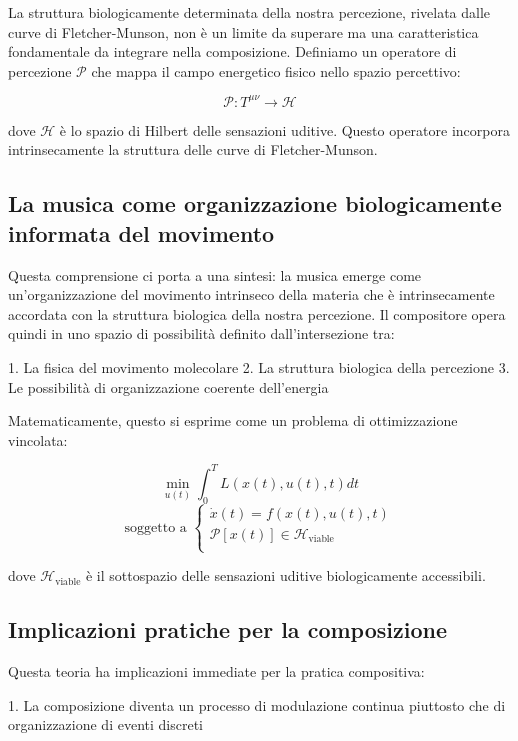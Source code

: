 \documentclass{gs-adonis}
\begin{document}
La struttura biologicamente determinata della nostra percezione,
rivelata dalle curve di Fletcher-Munson, non è un limite da superare ma
una caratteristica fondamentale da integrare nella composizione.
Definiamo un operatore di percezione \(\mathcal{P}\) che mappa il campo
energetico fisico nello spazio percettivo:

\[\mathcal{P}: T^{\mu\nu} \rightarrow \mathcal{H}\]

dove \(\mathcal{H}\) è lo spazio di Hilbert delle sensazioni uditive.
Questo operatore incorpora intrinsecamente la struttura delle curve di
Fletcher-Munson.

\subsection{La musica come organizzazione biologicamente informata del
movimento}\label{la-musica-come-organizzazione-biologicamente-informata-del-movimento}

Questa comprensione ci porta a una sintesi: la musica emerge come
un'organizzazione del movimento intrinseco della materia che è
intrinsecamente accordata con la struttura biologica della nostra
percezione. Il compositore opera quindi in uno spazio di possibilità
definito dall'intersezione tra:

1. La fisica del movimento molecolare 2. La struttura biologica della
percezione 3. Le possibilità di organizzazione coerente dell'energia

Matematicamente, questo si esprime come un problema di ottimizzazione
vincolata:

\[\min_{u(t)} \int_0^T L(x(t), u(t), t)dt\]
\[\text{soggetto a } \begin{cases}
\dot{x}(t) = f(x(t), u(t), t) \\
\mathcal{P}[x(t)] \in \mathcal{H}_{\text{viable}} \\
\end{cases}\]

dove \(\mathcal{H}_{\text{viable}}\) è il sottospazio delle sensazioni
uditive biologicamente accessibili.

\subsection{Implicazioni pratiche per la
composizione}\label{implicazioni-pratiche-per-la-composizione}

Questa teoria ha implicazioni immediate per la pratica compositiva:

1. La composizione diventa un processo di modulazione continua piuttosto
che di organizzazione di eventi discreti
\end{document}
